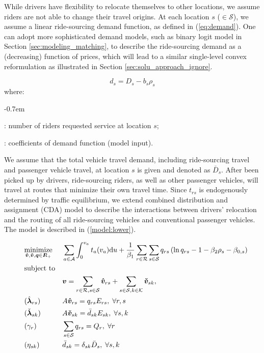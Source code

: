 \documentclass[review]{elsarticle}
\begin{document}
While drivers have flexibility to relocate themselves to other locations, we assume riders are not able to change their travel origins. At each location $s$ ($\in \mathcal{S}$), we  assume a linear ride-sourcing demand function, as defined in (\ref{eq:demand}). One can adopt more sophisticated demand models, such as binary logit model in Section \ref{sec:modeling_matching}, to describe the ride-sourcing demand as a (decreasing) function of prices, which will lead to a similar single-level convex reformulation as illustrated in Section \ref{sec:solu_approach_ignore}.

\begin{equation}
\label{eq:demand}
d_{s} = D_s - b_s\rho_{s}
\end{equation}
where: 
\begin{description}[leftmargin=!,labelwidth=\widthof{12345}]
	\itemsep-0.7em 
	\item[$d_{s}$]: number of riders requested service at location $s$;
	\item[$D_s, b_s$] : coefficients of demand function (model input).
\end{description}

We assume that the total vehicle travel demand, including ride-sourcing travel and passenger vehicle travel, at location $s$ is given and denoted as $\bar{D}_s$. After been picked up by drivers, ride-sourcing riders, as well as other passenger vehicles, will travel at routes that minimize their own travel time. Since $t_{rs}$ is endogenously determined by traffic equilibrium, we extend combined distribution and assignment (CDA) model \citep{wilson1969use} to describe the interactions between drivers' relocation and the routing of all ride-sourcing vehicles and conventional passenger vehicles. The model is described in  (\ref{model:lower}).

\begin{subequations}
\begin{align}
& & & \underset{\bm{\hat{v}},\bm{\check{v}}, \bm{q} \in {I\kern-.35em R}_+}{\text{minimize}}
& & \sum_{a \in \mathcal{A}} \int_{0}^{v_a} t_a(v_a) \mathrm{d}u + \frac{1}{\beta_1} \sum_{r \in \mathcal{R}}\sum_{s \in \mathcal{S}} q_{rs}\left(\ln q_{rs} - 1 - \beta_2\rho_s - \beta_{0,s}\right)\label{obj:lower} \\
& & & \text{subject to} \nonumber & & \\
& & & & & \bm{v} = \sum_{r \in \mathcal{R}, s \in \mathcal{S}}\bm{\hat{v}}_{rs}+ \sum_{s \in \mathcal{S}, k \in \mathcal{K}}\bm{\check{v}}_{sk} , \; \label{cons:v}\\
& & & (\hat{\bm{\lambda}}_{rs}) & & A\bm{\hat{v}}_{rs} = q_{rs}E_{rs} , \; \forall r, s\label{cons:v_q}\\
& & & (\check{\bm{\lambda}}_{sk}) & & A\bm{\check{v}}_{sk} = \bar{d}_{sk}E_{sk} , \; \forall s, k\label{cons:v_d}\\
& & & ({\gamma}_{r})& &  \sum_{s \in \mathcal{S}}{q_{rs}} = Q_r, \; \forall r\label{cons:q_Q}\\
& & & ({\eta}_{sk})& &  \bar{d}_{sk} = \delta_{sk} \bar{D}_s,\; \forall s, k\label{cons:d_D}
\end{align}
\label{model:lower}
\end{subequations}
\end{document}

